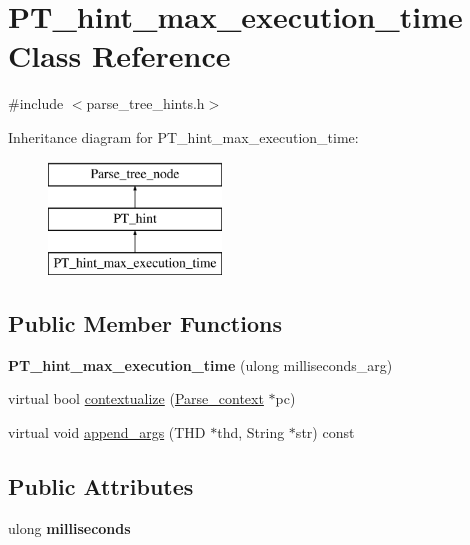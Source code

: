 \hypertarget{classPT__hint__max__execution__time}{}\section{P\+T\+\_\+hint\+\_\+max\+\_\+execution\+\_\+time Class Reference}
\label{classPT__hint__max__execution__time}


{\ttfamily \#include $<$parse\+\_\+tree\+\_\+hints.\+h$>$}

Inheritance diagram for P\+T\+\_\+hint\+\_\+max\+\_\+execution\+\_\+time\+:\begin{figure}[H]
\begin{center}
\leavevmode
\includegraphics[height=3.000000cm]{classPT__hint__max__execution__time}
\end{center}
\end{figure}
\subsection*{Public Member Functions}
\begin{DoxyCompactItemize}
\item 
\mbox{\label{classPT__hint__max__execution__time_a1e16c251ccf24c0dc3fb92e6b35d2959}} 
{\bfseries P\+T\+\_\+hint\+\_\+max\+\_\+execution\+\_\+time} (ulong milliseconds\+\_\+arg)
\item 
virtual bool \mbox{\hyperlink{classPT__hint__max__execution__time_a7d073143038eaf1eddc87b1c49f6c5aa}{contextualize}} (\mbox{\hyperlink{structParse__context}{Parse\+\_\+context}} $\ast$pc)
\item 
virtual void \mbox{\hyperlink{classPT__hint__max__execution__time_a5062df4e31c3ddc7a6d3b17166c7cfd1}{append\+\_\+args}} (T\+HD $\ast$thd, String $\ast$str) const
\end{DoxyCompactItemize}
\subsection*{Public Attributes}
\begin{DoxyCompactItemize}
\item 
\mbox{\label{classPT__hint__max__execution__time_afea2d32efd2f5f7da6b6b6f2195654ba}} 
ulong {\bfseries milliseconds}
\end{DoxyCompactItemize}
